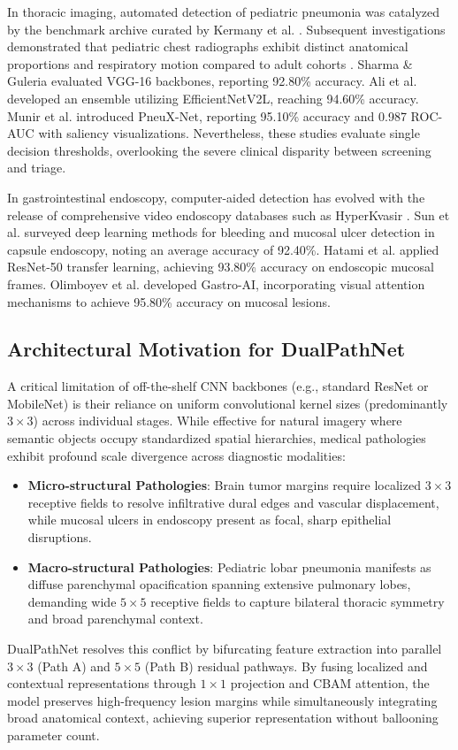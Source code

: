 \documentclass[conference]{IEEEtran}
\begin{document}
In thoracic imaging, automated detection of pediatric pneumonia was catalyzed by the benchmark archive curated by Kermany et al. \cite{kermany2018identifying}. Subsequent investigations demonstrated that pediatric chest radiographs exhibit distinct anatomical proportions and respiratory motion compared to adult cohorts \cite{sharma2023deep, ali2023pneumonia, munir2021pneuxnet}. Sharma \& Guleria \cite{sharma2023deep} evaluated VGG-16 backbones, reporting 92.80\% accuracy. Ali et al. \cite{ali2023pneumonia} developed an ensemble utilizing EfficientNetV2L, reaching 94.60\% accuracy. Munir et al. \cite{munir2021pneuxnet} introduced PneuX-Net, reporting 95.10\% accuracy and 0.987 ROC-AUC with saliency visualizations. Nevertheless, these studies evaluate single decision thresholds, overlooking the severe clinical disparity between screening and triage.

In gastrointestinal endoscopy, computer-aided detection has evolved with the release of comprehensive video endoscopy databases such as HyperKvasir \cite{borgli2020hyperkvasir}. Sun et al. \cite{sun2022deep} surveyed deep learning methods for bleeding and mucosal ulcer detection in capsule endoscopy, noting an average accuracy of 92.40\%. Hatami et al. \cite{hatami2020deep} applied ResNet-50 transfer learning, achieving 93.80\% accuracy on endoscopic mucosal frames. Olimboyev et al. \cite{olimboyev2022gastro} developed Gastro-AI, incorporating visual attention mechanisms to achieve 95.80\% accuracy on mucosal lesions.

\subsection{Architectural Motivation for DualPathNet}
A critical limitation of off-the-shelf CNN backbones (e.g., standard ResNet or MobileNet) is their reliance on uniform convolutional kernel sizes (predominantly $3\times 3$) across individual stages. While effective for natural imagery where semantic objects occupy standardized spatial hierarchies, medical pathologies exhibit profound scale divergence across diagnostic modalities:
\begin{itemize}
    \item \textbf{Micro-structural Pathologies}: Brain tumor margins require localized $3\times 3$ receptive fields to resolve infiltrative dural edges and vascular displacement, while mucosal ulcers in endoscopy present as focal, sharp epithelial disruptions.
    \item \textbf{Macro-structural Pathologies}: Pediatric lobar pneumonia manifests as diffuse parenchymal opacification spanning extensive pulmonary lobes, demanding wide $5\times 5$ receptive fields to capture bilateral thoracic symmetry and broad parenchymal context.
\end{itemize}
DualPathNet resolves this conflict by bifurcating feature extraction into parallel $3\times 3$ (Path A) and $5\times 5$ (Path B) residual pathways. By fusing localized and contextual representations through $1\times 1$ projection and CBAM attention, the model preserves high-frequency lesion margins while simultaneously integrating broad anatomical context, achieving superior representation without ballooning parameter count.
\end{document}
